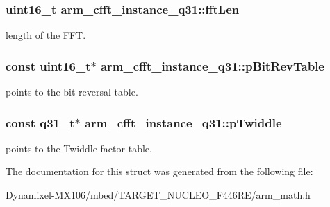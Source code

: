 \subsubsection[{\texorpdfstring{fft\+Len}{fftLen}}]{\setlength{\rightskip}{0pt plus 5cm}uint16\+\_\+t arm\+\_\+cfft\+\_\+instance\+\_\+q31\+::fft\+Len}\hypertarget{structarm__cfft__instance__q31_a4406f23e8fd0bff8d555225612e2a2a8}{}\label{structarm__cfft__instance__q31_a4406f23e8fd0bff8d555225612e2a2a8}
length of the F\+FT. 
\subsubsection[{\texorpdfstring{p\+Bit\+Rev\+Table}{pBitRevTable}}]{\setlength{\rightskip}{0pt plus 5cm}const uint16\+\_\+t$\ast$ arm\+\_\+cfft\+\_\+instance\+\_\+q31\+::p\+Bit\+Rev\+Table}\hypertarget{structarm__cfft__instance__q31_a8a464461649f023325ced1e10470f5d0}{}\label{structarm__cfft__instance__q31_a8a464461649f023325ced1e10470f5d0}
points to the bit reversal table. 
\subsubsection[{\texorpdfstring{p\+Twiddle}{pTwiddle}}]{\setlength{\rightskip}{0pt plus 5cm}const q31\+\_\+t$\ast$ arm\+\_\+cfft\+\_\+instance\+\_\+q31\+::p\+Twiddle}\hypertarget{structarm__cfft__instance__q31_af751114feb91de3ace8600e91bdd0872}{}\label{structarm__cfft__instance__q31_af751114feb91de3ace8600e91bdd0872}
points to the Twiddle factor table. 

The documentation for this struct was generated from the following file\+:\begin{DoxyCompactItemize}
\item 
Dynamixel-\/\+M\+X106/mbed/\+T\+A\+R\+G\+E\+T\+\_\+\+N\+U\+C\+L\+E\+O\+\_\+\+F446\+R\+E/arm\+\_\+math.\+h\end{DoxyCompactItemize}
